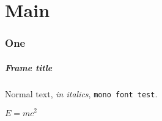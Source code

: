 \documentclass{taltechslides}
\begin{document}
\maketitle

\part{Main}

\section{One}

\begin{frame}[fragile]
    \frametitle{Frame title}

    Normal text, \textit{in italics}, \texttt{mono font test}.

    \(E=mc^2\)

\end{frame}
\end{document}
